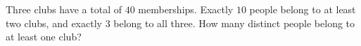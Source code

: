 Three clubs have a total of $40$ memberships. Exactly $10$ people belong to at least two clubs, and exactly $3$ belong to all three. How many distinct people belong to at least one club?
